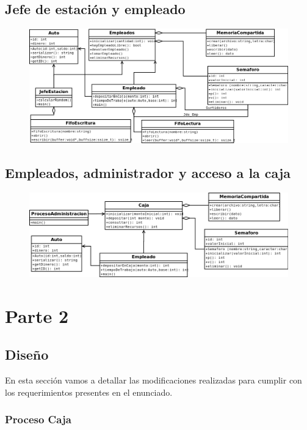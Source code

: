\documentclass[12pt,a4paper,spanish]{article}
\begin{document}
	\newpage		
	\subsection{Jefe de estación y empleado}
	\begin{figure}[h]
	\includegraphics[scale=0.50, angle=90]{JDE_Empleado.png}
	\centering
	\end{figure}

	\newpage	
	\subsection{Empleados, administrador y acceso a la caja}
	\begin{figure}[h]
	\includegraphics[scale=0.50, angle=90]{AccesoCaja.png}
	\centering
	\end{figure}

	\newpage

	\section{Parte 2}

	\subsection{Diseño}

	En esta sección vamos a detallar las modificaciones realizadas para cumplir con
	los requerimientos presentes en el enunciado.

	\subsubsection{Proceso Caja}
\end{document}
